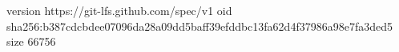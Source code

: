 version https://git-lfs.github.com/spec/v1
oid sha256:b387cdcbdee07096da28a09dd5baff39efddbc13fa62d4f37986a98e7fa3ded5
size 66756
